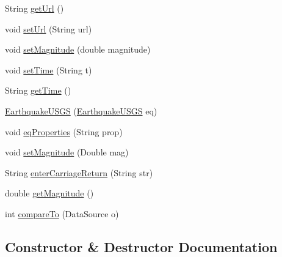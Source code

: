 \begin{DoxyCompactItemize}
\item 
String \mbox{\hyperlink{classbridges_1_1data__src__dependent_1_1_earthquake_u_s_g_s_a2af3938390c31096329e635510df437e}{get\+Url}} ()
\item 
void \mbox{\hyperlink{classbridges_1_1data__src__dependent_1_1_earthquake_u_s_g_s_aaa9d26333e7b80d0f72da58ea2ad41d1}{set\+Url}} (String url)
\item 
void \mbox{\hyperlink{classbridges_1_1data__src__dependent_1_1_earthquake_u_s_g_s_ad7902d80cbbe11046858db1f2792e99d}{set\+Magnitude}} (double magnitude)
\item 
void \mbox{\hyperlink{classbridges_1_1data__src__dependent_1_1_earthquake_u_s_g_s_ae3813930d3468eff007521f33c8e2139}{set\+Time}} (String t)
\item 
String \mbox{\hyperlink{classbridges_1_1data__src__dependent_1_1_earthquake_u_s_g_s_a03397a4410818546c5232f46a3d4ffc4}{get\+Time}} ()
\item 
\mbox{\hyperlink{classbridges_1_1data__src__dependent_1_1_earthquake_u_s_g_s_a6b9281a299d6e60736355eb8833f9e0d}{Earthquake\+U\+S\+GS}} (\mbox{\hyperlink{classbridges_1_1data__src__dependent_1_1_earthquake_u_s_g_s}{Earthquake\+U\+S\+GS}} eq)
\item 
void \mbox{\hyperlink{classbridges_1_1data__src__dependent_1_1_earthquake_u_s_g_s_acc0ba6890ee5963f88a399523f009ae4}{eq\+Properties}} (String prop)
\item 
void \mbox{\hyperlink{classbridges_1_1data__src__dependent_1_1_earthquake_u_s_g_s_a34a4c6ebe01c5daa7c86b3a4207d633f}{set\+Magnitude}} (Double mag)
\item 
String \mbox{\hyperlink{classbridges_1_1data__src__dependent_1_1_earthquake_u_s_g_s_aade0ce9a2fee927b015f5eb495c481e1}{enter\+Carriage\+Return}} (String str)
\item 
double \mbox{\hyperlink{classbridges_1_1data__src__dependent_1_1_earthquake_u_s_g_s_a3ec5d753277d6287b222448ff2477291}{get\+Magnitude}} ()
\item 
int \mbox{\hyperlink{classbridges_1_1data__src__dependent_1_1_earthquake_u_s_g_s_a60cad0a286825f77cd2900265acae982}{compare\+To}} (Data\+Source o)
\end{DoxyCompactItemize}


\subsection{Constructor \& Destructor Documentation}
\mbox{\label{classbridges_1_1data__src__dependent_1_1_earthquake_u_s_g_s_a1803f7d357ce045cefbc923e096e9646}} 
